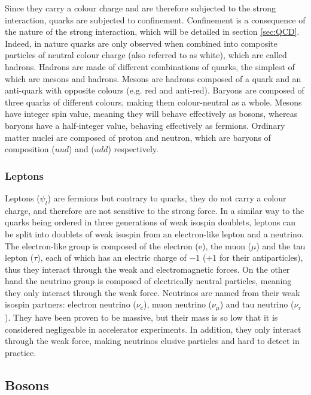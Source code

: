 Since they carry a colour charge and are therefore subjected to the strong interaction, quarks are subjected to confinement. Confinement is a consequence of the nature of the strong interaction, which will be detailed in section \ref{sec:QCD}. Indeed, in nature quarks are only observed when combined into composite particles of neutral colour charge (also referred to as white), which are called hadrons. Hadrons are made of different combinations of quarks, the simplest of which are mesons and hadrons. Mesons are hadrons composed of a quark and an anti-quark with opposite colours (e.g. red and anti-red). Baryons are composed of three quarks of different colours, making them colour-neutral as a whole. Mesons have integer spin value, meaning they will behave effectively as bosons, whereas baryons have a half-integer value, behaving effectively as fermions. Ordinary matter nuclei are composed of proton and neutron, which are baryons of composition ($uud$) and ($udd$) respectively.

\subsubsection{Leptons}

Leptons ($\psi_l$) are fermions but contrary to quarks, they do not carry a colour charge, and therefore are not sensitive to the strong force. In a similar way to the quarks being ordered in three generations of weak isospin doublets, leptons can be split into doublets of weak isospin from an electron-like lepton and a neutrino. The electron-like group is composed of the electron (e), the muon ($\mu$) and the tau lepton ($\tau$), each of which has an electric charge of $-1$ ($+1$ for their antiparticles), thus they interact through the weak and electromagnetic forces. On the other hand the neutrino group is composed of electrically neutral particles, meaning they only interact through the weak force. Neutrinos are named from their weak isospin partners: electron neutrino ($\nu_e$), muon neutrino ($\nu_{\mu}$) and tau neutrino ($\nu_{\tau}$). They have been proven to be massive, but their mass is so low that it is considered negligeable in accelerator experiments. In addition, they only interact through the weak force, making neutrinos elusive particles and hard to detect in practice.

\subsection{Bosons}

